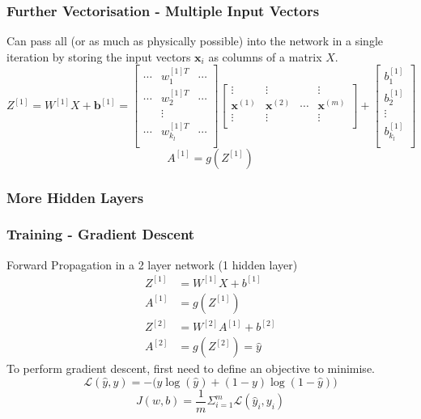 \documentclass{beamer}
\newcommand{\mb}[1]{\mathbf{#1}}
\begin{document}
% 
% 
% 
% 
\begin{frame}
  \frametitle{Further Vectorisation - Multiple Input Vectors}
  Can pass all (or as much as physically possible) into the network in a single iteration by storing the input vectors $\mb{x}_i$ as columns of a matrix $X$.
  \begin{equation*}
    Z^{[1]} = W^{[1]} X + \mathbf{b}^{[1]} = 
    \begin{bmatrix}
      \cdots & w_{1}^{[1]T} & \cdots \\
      \cdots & w_{2}^{[1]T} & \cdots \\
      & \vdots       &  \\
      \cdots & w_{k_l}^{[1]T} & \cdots \\
    \end{bmatrix}
    \begin{bmatrix}
      \vdots & \vdots & & \vdots\\
      \mathbf{x}^{(1)} & \mathbf{x}^{(2)} &  \cdots & \mathbf{x}^{(m)}\\
      \vdots & \vdots & & \vdots\\
    \end{bmatrix}
    + 
    \begin{bmatrix}
      b_{1}^{[1]} \\
      b_{2}^{[1]} \\
      \vdots \\
      b_{k_l}^{[1]} \\
    \end{bmatrix}
  \end{equation*}
  \vspace*{1cm}
  \begin{equation*}
    A^{[1]} = g( Z^{[1]} )
  \end{equation*}
\end{frame}
% 
% 
% 
% 
\begin{frame}
  \frametitle{More Hidden Layers}
  
\end{frame}
% 
% 
% 
% 
\begin{frame}
  \frametitle{Training - Gradient Descent}
  Forward Propagation in a 2 layer network (1 hidden layer)
  \begin{align*}
    Z^{[1]} &= W^{[1]}X + b^{[1]}\\
    A^{[1]} &= g(Z^{[1]})\\
    Z^{[2]} &= W^{[2]}A^{[1]} + b^{[2]}\\
    A^{[2]} &= g(Z^{[2]}) = \hat{y}
  \end{align*}
  To perform gradient descent, first need to define an objective to minimise.
  \begin{equation*}
    \mathcal{L}(\hat{y}, y) = - \Big(y\log(\hat{y}) + (1-y)\log(1 - \hat{y})  \Big)
  \end{equation*}
  \begin{equation*}
    J(w,b) =\frac{1}{m} \Sigma_{i=1}^{m}\mathcal{L}(\hat{y}_i, y_i)
  \end{equation*}
\end{frame}
\end{document}
